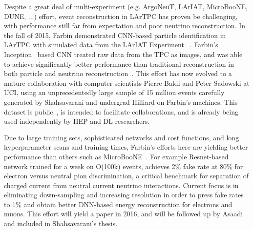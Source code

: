 
Despite a great deal of multi-experiment (e.g. ArgoNeuT, LArIAT,
MicroBooNE, DUNE, ...) effort, event reconstruction in LArTPC has
proven be challenging, with performance still far from expectation and
poor neutrino reconstruction.  In the fall of 2015, Farbin
demonstrated CNN-based particle identification in LArTPC with
simulated data from the LArIAT Experiment ~\cite{}.  Farbin's
Inception~\cite{} based CNN treated raw data from the TPC as images,
and was able to achieve significantly better performance than
traditional reconstruction in both particle and neutrino
reconstruction~\cite{}. This effort has now evolved to a mature
collaboration with computer scientists Pierre Baldi and Peter Sadowski
at UCI, using an unprecedentedly large sample of 15 million events
carefully generated by Shahsavarani and undergrad Hilliard on Farbin's
machines. This dataset is public~\cite{}, is intended to facilitate
collaborations, and is already being used independently by HEP and DL
researchers. 

Due to large training sets, sophisticated networks and cost functions,
and long hyperparameter scans and training times, Farbin's efforts
here are yielding better performance than others such as
MicroBooNE~\cite{}. For example Resnet-based network trained for a
week on O(100k) events, achieves 2\% fake rate at 80\% for electron
versus neutral pion discrimination, a critical benchmark for
separation of charged current from neutral current neutrino
interactions. Current focus is in eliminating down-sampling and
increasing resolution in order to press fake rates to 1\% and obtain
better DNN-based energy reconstruction for electrons and muons. This
effort will yield a paper in 2016, and will be followed up by Asaadi
and included in Shahsavarani's thesis.



